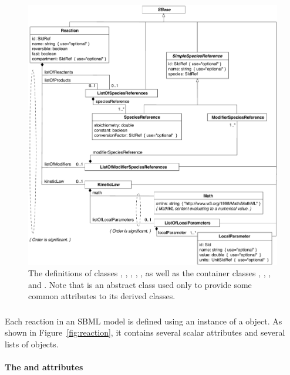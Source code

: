 \begin{figure}[htb]
  \centering
  \vspace*{2ex}
  \includegraphics[scale=0.8]{figs/reaction-uml-v2}
  \vspace*{0.5ex}
  \caption{The definitions of classes \Reaction, \KineticLaw,
      \SpeciesReference, \ModifierSpeciesReference, \LocalParameter,
      as well as the
      container classes \ListOfReactants, \ListOfProducts,
      \ListOfModifiers, and \ListOfLocalParameters.  Note that
      \SimpleSpeciesReference is an abstract class used only to
      provide some common attributes to its derived classes.}
  \label{fig:reaction}
\end{figure}


\subsubsection{}
\label{sec:reaction-type}
\label{sec:listofreactants}
\label{sec:listofproducts}
\label{sec:listofmodifiers}

Each reaction in an SBML model is defined using an instance of a
\Reaction object.  As shown in Figure~\vref{fig:reaction}, it
contains several scalar attributes and several lists of objects.


\paragraph{The  and  attributes}

